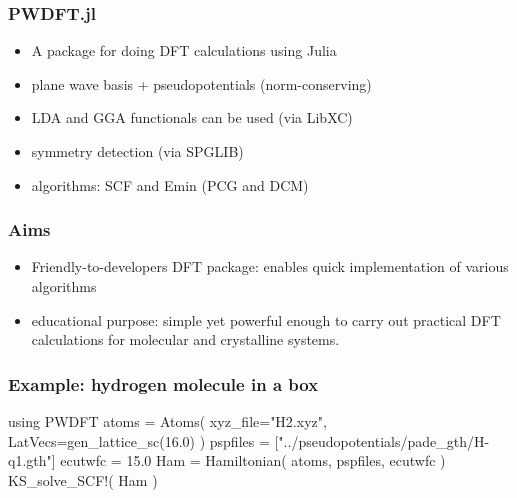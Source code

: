 \documentclass[english,9pt]{beamer}
\begin{document}
\begin{frame}
\frametitle{PWDFT.jl}

\begin{itemize}
\item A package for doing DFT calculations using Julia
\item plane wave basis + pseudopotentials (norm-conserving)
\item LDA and GGA functionals can be used (via LibXC)
\item symmetry detection (via SPGLIB)
\item algorithms: SCF and Emin (PCG and DCM)
\end{itemize}

\end{frame}


\begin{frame}
\frametitle{Aims}

\begin{itemize}
\item Friendly-to-developers DFT package: enables quick implementation of various algorithms
\item educational purpose: simple yet powerful enough to carry out practical DFT calculations
for molecular and crystalline systems.
\end{itemize}

\end{frame}


\begin{frame}[fragile]
\frametitle{Example: hydrogen molecule in a box}

\begin{juliacode}
using PWDFT
atoms = Atoms( xyz_file="H2.xyz",
               LatVecs=gen_lattice_sc(16.0) )
pspfiles = ["../pseudopotentials/pade_gth/H-q1.gth"]
ecutwfc = 15.0
Ham = Hamiltonian( atoms, pspfiles, ecutwfc )
KS_solve_SCF!( Ham )
\end{juliacode}

\end{frame}
\end{document}
